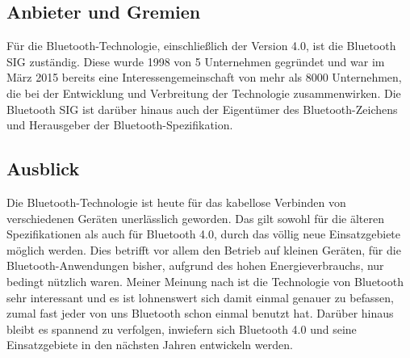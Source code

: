 \begin{multicols}{3}
\subsection*{Anbieter und Gremien}
Für die Bluetooth-Technologie, einschließlich der Version 4.0, ist die Bluetooth SIG zuständig. Diese wurde 1998 von 5 Unternehmen gegründet und war im März 2015 bereits eine Interessengemeinschaft von mehr als 8000 Unternehmen, die bei der Entwicklung und Verbreitung der Technologie zusammenwirken. Die Bluetooth SIG ist darüber hinaus auch der Eigentümer des Bluetooth-Zeichens und Herausgeber der Bluetooth-Spezifikation. \cite{Bluetooth_4.4}

\subsection*{Ausblick}
Die Bluetooth-Technologie ist heute für das kabellose 
Verbinden von verschiedenen Geräten unerlässlich geworden. 
Das gilt sowohl für die älteren Spezifikationen als auch für 
Bluetooth 4.0, durch das völlig neue Einsatzgebiete möglich werden. 
Dies betrifft vor allem den Betrieb auf kleinen Geräten, für die 
Bluetooth-Anwendungen bisher, aufgrund des hohen Energieverbrauchs,
nur bedingt nützlich waren. Meiner Meinung nach ist die Technologie
von Bluetooth sehr interessant und es ist lohnenswert sich damit einmal
genauer zu befassen, zumal fast jeder von uns Bluetooth schon einmal benutzt hat. 
Darüber hinaus bleibt es spannend zu verfolgen, inwiefern sich Bluetooth 4.0 
und seine Einsatzgebiete in den nächsten Jahren entwickeln werden.
\printbibliography[segment=3,heading=subbibliography]
\end{multicols}

\newpage
